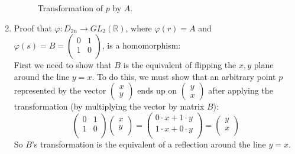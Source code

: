 \documentclass{article}
\newcommand{\R}{\mathbb{R}}
\begin{document}
\begin{enumerate}[label=\textbf{\alph*.}]
\begin{figure}[H]
\begin{tikzpicture}[scale=2.5]
                    \end{tikzpicture}
            
                    \caption{\label{fig:figure1} Transformation of $p$ by $A$.}
                \end{figure}
        \item 
            Proof that $\varphi: D_{2n} \to GL_2(\R)$,
            where $\varphi(r) = A$ and $\varphi(s) = B =
            \begin{pmatrix}
                0 & 1 \\
                1 & 0 \\
            \end{pmatrix}$,
            is a homomorphism: \\
            First we need to show that $B$ is the equivalent of flipping
            the $x, y$ plane around the line $y = x$.
            To do this, we must show that an arbitrary point $p$
            represented by the vector $\begin{pmatrix} x \\ y \end{pmatrix}$
            ends up on $\begin{pmatrix} y \\ x \end{pmatrix}$
            after applying the transformation
            (by multiplying the vector by matrix $B$):
            \[  \begin{pmatrix}
                0 & 1 \\
                1 & 0 \\
            \end{pmatrix} 
            \begin{pmatrix}
                x \\
                y \\
            \end{pmatrix} 
            = \begin{pmatrix}
                0 \cdot x + 1 \cdot y \\
                1 \cdot x + 0 \cdot y \\
            \end{pmatrix} 
            =  \begin{pmatrix}
                y \\
                x \\
            \end{pmatrix} \]
            So $B$'s transformation is the equivalent of a reflection 
            around the line $y = x$.
        

\end{enumerate}
\end{document}
